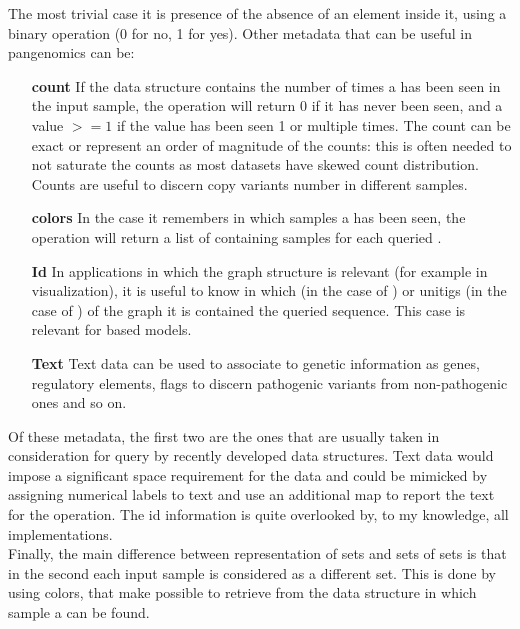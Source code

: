 The most trivial case it is presence of the absence of an element inside it, using a binary \memb operation (0 for no, 1 for yes).  Other metadata that can be useful in pangenomics can be:
\begin{itemize}
	\item[\textbf{count}] If the data structure contains the number of times a \kmer has been seen in the input sample, the \memb operation will return 0 if it has never been seen, and a value $>= 1$ if the value has been seen 1 or multiple times. The count can be exact or represent an order of magnitude of the counts: this is often needed to not saturate the counts as most datasets have skewed \kmer count distribution. Counts are useful to discern copy variants number in different samples.
	\item[\textbf{colors}] In the case it remembers in which samples a \kmer has been seen, the \memb operation will return a list of containing samples for each queried \kmer. 
	\item[\textbf{Id}] In applications in which the graph structure is relevant (for example in visualization), it is useful to know in which \kmers (in the case of \dbg) or unitigs (in the case of \cdbg) of the graph it is contained the queried sequence. This case is relevant for \dbg based models.
	\item[\textbf{Text}] Text data can be used to associate \kmers to genetic information as genes, regulatory elements, flags to discern pathogenic variants from non-pathogenic ones and so on.
\end{itemize}
Of these metadata, the first two are the ones that are usually taken in consideration for query by recently developed data structures. Text data would impose a significant space requirement for the data and could be mimicked by assigning numerical labels to text and use an additional map to report the text for the \memb operation. The id information is quite overlooked by, to my knowledge, all implementations.\\
Finally, the main difference between representation of \kmer sets and sets of \kmer sets is that in the second each input sample is considered as a different set. This is done by using colors, that make possible to retrieve from the data structure in which sample a \kmer can be found.

